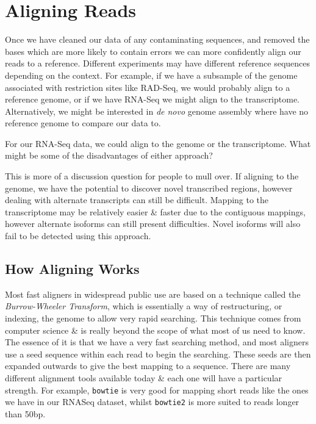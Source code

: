 \chapter{Aligning Reads}


\begin{note}
Once we have cleaned our data of any contaminating sequences, and removed the bases which are more likely to contain errors we can more confidently align our reads to a reference.
Different experiments may have different reference sequences depending on the context.
For example, if we have a subsample of the genome associated with restriction sites like RAD-Seq, we would probably align to a reference genome, or if we have RNA-Seq we might align to the transcriptome.
Alternatively, we might be interested in \textit{de novo} genome assembly where have no reference genome to compare our data to.
\end{note}

\begin{questions}
For our RNA-Seq data, we could align to the genome or the transcriptome.
What might be some of the disadvantages of either approach? \\
\begin{answer}
This is more of a discussion question for people to mull over.
If aligning to the genome, we have the potential to discover novel transcribed regions, however dealing with alternate transcripts can still be difficult.
Mapping to the transcriptome may be relatively easier \& faster due to the contiguous mappings,
however alternate isoforms can still present difficulties.
Novel isoforms will also fail to be detected using this approach. \\
\end{answer}
\end{questions}

\section{How Aligning Works}
\begin{note}
Most fast aligners in widespread public use are based on a technique called the \textit{Burrow-Wheeler Transform}, which is essentially a way of restructuring, or indexing, the genome to allow very rapid searching.
This technique comes from computer science \& is really beyond the scope of what most of us need to know.
The essence of it is that we have a very fast searching method, and most aligners use a seed sequence within each read to begin the searching.
These seeds are then expanded outwards to give the best mapping to a sequence.
There are many different alignment tools available today \& each one will have a particular strength.
For example, \texttt{bowtie} is very good for mapping short reads like the ones we have in our RNASeq dataset, whilst \texttt{bowtie2} is more suited to reads longer than 50bp.
\end{note}

